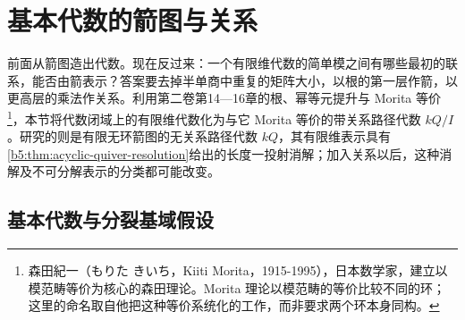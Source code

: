 
\section{基本代数的箭图与关系}
\label{b5:sec:0905}


%
%
%

前面从箭图造出代数。现在反过来：一个有限维代数的简单模之间有哪些最初的联系，能否由箭表示？答案要去掉半单商中重复的矩阵大小，以根的第一层作箭，以更高层的乘法作关系。利用第二卷第14—16章的根、幂等元提升与 Morita 等价\footnote{森田紀一（もりた きいち，Kiiti Morita，1915-1995），日本数学家，建立以模范畴等价为核心的森田理论。Morita 理论以模范畴的等价比较不同的环；这里的命名取自他把这种等价系统化的工作，而非要求两个环本身同构。}，本节将代数闭域上的有限维代数化为与它 Morita 等价的带关系路径代数 \(kQ/I\)。研究的则是有限无环箭图的无关系路径代数 \(kQ\)，其有限维表示具有\cref{b5:thm:acyclic-quiver-resolution}给出的长度一投射消解；加入关系以后，这种消解及不可分解表示的分类都可能改变。

\subsection{基本代数与分裂基域假设}
\label{b5:subsec:0905:01}

